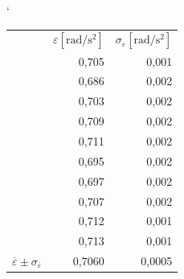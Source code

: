\documentclass[english]{article}
\newcommand{\unit}[1]{\mathrm{#1}}
\begin{document}
\begin{table}[h]
\catcode` %
\parbox{.45\linewidth}{
\centering
\begin{tabular}{|r|r|r|}
      \cline{2-3}    \multicolumn{1}{r|}{} & $\varepsilon \unit{[ rad/s^2]}$ & $\sigma_{\varepsilon}\unit{ [rad/s^2]}$ \bigstrut\\
      \cline{2-3}    \multicolumn{1}{r|}{} & 0,705 & 0,001 \bigstrut\\
      \cline{2-3}    \multicolumn{1}{r|}{} & 0,686 & 0,002 \bigstrut\\
      \cline{2-3}    \multicolumn{1}{r|}{} & 0,703 & 0,002 \bigstrut\\
      \cline{2-3}    \multicolumn{1}{r|}{} & 0,709 & 0,002 \bigstrut\\
      \cline{2-3}    \multicolumn{1}{r|}{} & 0,711 & 0,002 \bigstrut\\
      \cline{2-3}    \multicolumn{1}{r|}{} & 0,695 & 0,002 \bigstrut\\
      \cline{2-3}    \multicolumn{1}{r|}{} & 0,697 & 0,002 \bigstrut\\
      \cline{2-3}    \multicolumn{1}{r|}{} & 0,707 & 0,002 \bigstrut\\
      \cline{2-3}    \multicolumn{1}{r|}{} & 0,712 & 0,001 \bigstrut\\
      \cline{2-3}    \multicolumn{1}{r|}{} & 0,713 & 0,001 \bigstrut\\
          \hline
          $\overline{\varepsilon} \pm \sigma_{\overline{\varepsilon}}$ & 0,7060 & 0,0005 \bigstrut\\
          \hline
          \end{tabular}%
      
}
\end{table}
\end{document}
